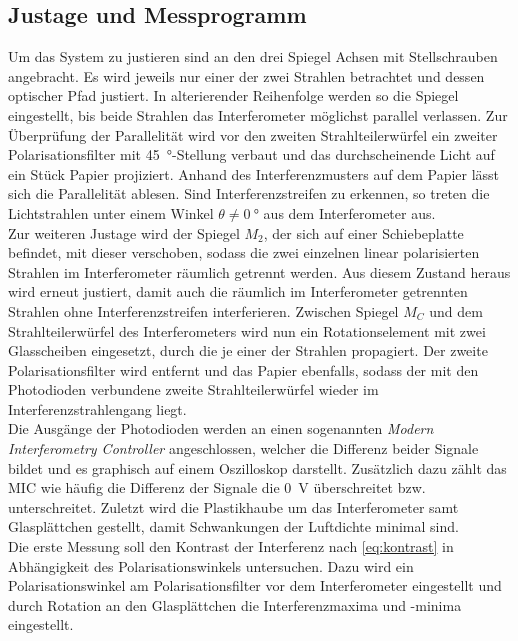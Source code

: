 \subsection{Justage und Messprogramm}
Um das System zu justieren sind an den drei Spiegel Achsen mit Stellschrauben angebracht.
Es wird jeweils nur einer der zwei Strahlen betrachtet und dessen optischer Pfad justiert.
In alterierender Reihenfolge werden so die Spiegel eingestellt, bis beide Strahlen das Interferometer möglichst parallel verlassen.
Zur Überprüfung der Parallelität wird vor den zweiten Strahlteilerwürfel ein zweiter Polarisationsfilter mit \SI{45}{\degree}-Stellung verbaut und das durchscheinende Licht auf ein Stück Papier projiziert.
Anhand des Interferenzmusters auf dem Papier lässt sich die Parallelität ablesen.
Sind Interferenzstreifen zu erkennen, so treten die Lichtstrahlen unter einem Winkel $\theta \neq \SI{0}{\degree}$ aus dem Interferometer aus.\\
Zur weiteren Justage wird der Spiegel $M_2$, der sich auf einer Schiebeplatte befindet, mit dieser verschoben, sodass die zwei einzelnen linear polarisierten Strahlen im Interferometer räumlich getrennt werden.
Aus diesem Zustand heraus wird erneut justiert, damit auch die räumlich im Interferometer getrennten Strahlen ohne Interferenzstreifen interferieren.
Zwischen Spiegel $M_C$ und dem Strahlteilerwürfel des Interferometers wird nun ein Rotationselement mit zwei Glasscheiben eingesetzt, durch die je einer der Strahlen propagiert.
Der zweite Polarisationsfilter wird entfernt und das Papier ebenfalls, sodass der mit den Photodioden verbundene zweite Strahlteilerwürfel wieder im Interferenzstrahlengang liegt.\\
Die Ausgänge der Photodioden werden an einen sogenannten \textit{Modern Interferometry Controller} angeschlossen, welcher die Differenz beider Signale bildet und es graphisch auf einem Oszilloskop darstellt.
Zusätzlich dazu zählt das MIC wie häufig die Differenz der Signale die \SI{0}{\volt} überschreitet bzw. unterschreitet.
Zuletzt wird die Plastikhaube um das Interferometer samt Glasplättchen gestellt, damit Schwankungen der Luftdichte minimal sind.\\
\newline
Die erste Messung soll den Kontrast der Interferenz nach \autoref{eq:kontrast} in Abhängigkeit des Polarisationswinkels untersuchen.
Dazu wird ein Polarisationswinkel am Polarisationsfilter vor dem Interferometer eingestellt und durch Rotation an den Glasplättchen die Interferenzmaxima und -minima eingestellt.
